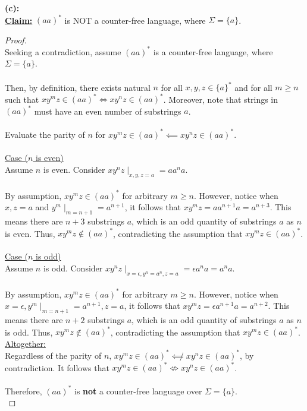 \documentclass[12pt]{article}
\begin{document}
\textbf{(c):} \\
\textbf{\underline{Claim:}} $(aa)^*$ is NOT a counter-free language, where $\Sigma = \{ a \}$.
\begin{proof}
\leavevmode\\
    Seeking a contradiction, assume $(aa)^*$ is a counter-free language, where $\Sigma = \{a\}$. \\
    \\
    Then, by definition, there exists natural $n$ for all $x, y, z \in \{a\}^*$ and for all $m \geq n$ such that $xy^mz \in (aa)^* \iff xy^nz \in (aa)^*$. Moreover, note that strings in $(aa)^*$ must have an even number of substrings $a$. \\
    \\
    Evaluate the parity of $n$ for $xy^mz \in (aa)^* \impliedby xy^nz \in (aa)^*$. \\
    \\
    \underline{Case ($n$ is even)} \\
    Assume $n$ is even. Consider $xy^nz \mid_{x, y, z = a} = aa^na$. \\
    \\
    By assumption, $xy^mz \in (aa)^*$ for arbitrary $m \geq n$. However, notice when $x, z = a$ and $y^m \mid_{m = n + 1} = a^{n + 1}$, it follows that $xy^mz = aa^{n + 1}a = a^{n + 3}$. This means there are $n + 3$ substrings $a$, which is an odd quantity of substrings $a$ as $n$ is even. Thus, $xy^mz \notin (aa)^*$, contradicting the assumption that $xy^mz \in (aa)^*$. \\
    \\
    \underline{Case ($n$ is odd)} \\
    Assume $n$ is odd. Consider $xy^nz \mid_{x = \epsilon, y^n = a^n, z = a} = \epsilon a^na = a^na$. \\
    \\
    By assumption, $xy^mz \in (aa)^*$ for arbitrary $m \geq n$. However, notice when $x = \epsilon, y^m \mid_{m = n + 1} = a^{n + 1}, z = a$, it follows that $xy^mz = \epsilon a^{n + 1} a = a^{n + 2}$. This means there are $n + 2$ substrings $a$, which is an odd quantity of substrings $a$ as $n$ is odd. Thus, $xy^mz \notin (aa)^*$, contradicting the assumption that $xy^mz \in (aa)^*$.
    \\
    \underline{Altogether:} \\
    Regardless of the parity of $n$, $xy^mz \in (aa)^* \not\impliedby xy^nz \in (aa)^*$, by contradiction. It follows that $xy^mz \in (aa)^* \not\iff xy^nz \in (aa)^*$. \\
    \\
    Therefore, $(aa)^*$ is \textbf{not} a counter-free language over $\Sigma = \{a\}$. \\
\end{proof}
\pagebreak
\end{document}
